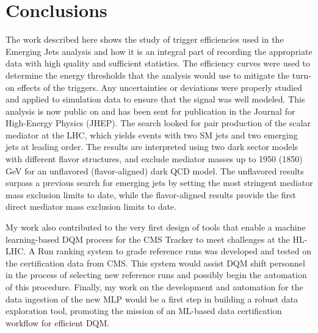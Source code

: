 \chapter{Conclusions}\label{ch:conclusion}

The work described here shows the study of trigger efficiencies used in the Emerging Jets analysis and how it is an integral part of recording the appropriate data with high quality and sufficient statistics. The efficiency curves were used to determine the energy thresholds that the analysis would use to mitigate the turn-on effects of the triggers. Any uncertainties or deviations were properly studied and applied to simulation data to ensure that the signal was well modeled. This analysis is now public on \cite{CMS:2024gxp} and has been sent for publication in the Journal for High-Energy Physics (JHEP). The search looked for pair production of the scalar mediator at the LHC, which yields events with two SM jets and two emerging jets at leading order. The results are interpreted using two dark sector models with different flavor structures, and exclude mediator masses up to 1950 (1850) GeV for an unflavored (flavor-aligned) dark QCD model. The unflavored results surpass a previous search for emerging jets by setting the most stringent mediator mass exclusion limits to date, while the flavor-aligned results provide the first direct mediator mass exclusion limits to date.


My work also contributed to the very first design of tools that enable a machine learning-based DQM process for the CMS Tracker to meet challenges at the HL-LHC. A Run ranking system to grade reference runs was developed and tested on the certification data from CMS. This system would assist DQM shift personnel in the process of selecting new reference runs and possibly begin the automation of this procedure. Finally, my work on the development and automation for the data ingestion of the new MLP would be a first step in building a robust data exploration tool, promoting the mission of an ML-based data certification workflow for efficient DQM.
